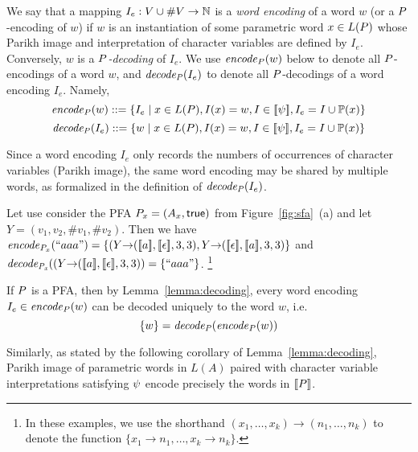 \documentclass[sigplan,review,anonymous]{acmart}\settopmatter{printfolios=true,printccs=false,printacmref=false}
\begin{document}
We say that a mapping $I_e:V\cup\#V \rightarrow \mathbb{N}$ is a \emph{word encoding} of a word $w$  (or a $P$-encoding of $w$) if $w$ is an instantiation of some parametric word $x \in L(P)$ whose Parikh image and interpretation of character variables are defined by $I_e$.  
%
Conversely, $w$ is a \emph{$P$-decoding} of $I_e$.
%
We use $\mathit{encode}_{P}(w)$ below to denote all $P$-encodings of a word $w$,
and $\mathit{decode_{P}} (I_e)$ to denote all $P$-decodings of a word encoding $I_e$. Namely,  
	$$\mathit{encode}_{P}( w ) ::= \{I_e \mid  x \in L(P) , I(x) =w, I\in[\![\psi]\!], I_e = I \cup \mathbb{P}{(x)}\}$$
	$$\mathit{decode_{P}}(I_e) ::=\{ w \mid x \in L(P) , I(x) =w, I\in[\![\psi]\!], I_e = I \cup \mathbb{P}{(x)} \}$$

Since a word encoding $I_e$ only records the numbers of occurrences of character variables (Parikh image), 
the same word encoding may be shared by multiple words, as formalized in the definition of $\mathit{decode_{P}}(I_e)$. 

\begin{example}
Let use consider the PFA ${P_x}=(A_x,\mbox{$\mathsf{true}$})$ from Figure~\ref{fig:sfa}~(a) and let $Y{=}(v_1,v_2,\#v_1,\#v_2)$. Then we have\\
$\encode {\pa_x}( ``aaa" ) =\{ (Y{\rightarrow}(\semof{a},\semof{\epsilon},3,3), Y{\rightarrow}(\semof{\epsilon},\semof{a},3,3)  \}$ and
$\mathit{decode_{P_x}}((Y{\rightarrow}([\![a]\!],[\![\epsilon]\!],3,3))=\{``aaa"\} $.
\footnote{In these examples, we use the shorthand $(x_1,\ldots,x_k)\rightarrow(n_1,\ldots,n_k)$ to denote the function $\{x_1 \rightarrow n_1,\ldots, x_k\rightarrow n_k\}$.}
\end{example}

If $P$ is a PFA, then by Lemma~\ref{lemma:decoding}, every word encoding $I_e\in \mathit{encode}_{P}( w )$ can be decoded uniquely to the word $w$, i.e.
$$
\{w\} = \mathit{decode_{P}} (\mathit{encode}_{P} (w))
$$

Similarly, as stated by the following corollary of Lemma~\ref{lemma:decoding}, 
Parikh image of parametric words in $L(A)$ paired with character variable interpretations satisfying $\psi$ encode precisely the words in $[\![P]\!]$.
\end{document}
